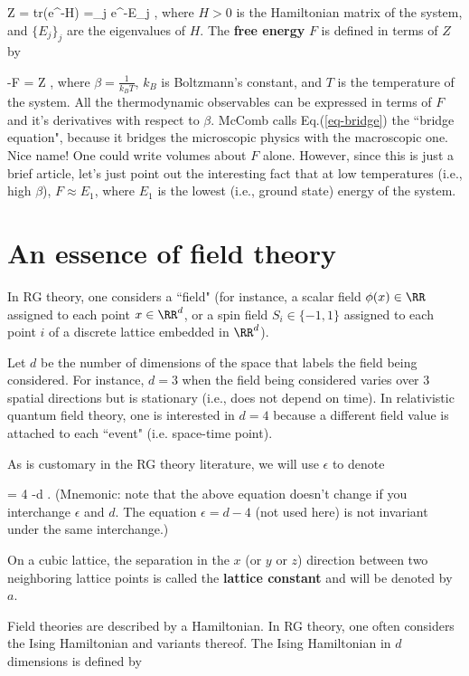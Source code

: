 \documentclass[12pt]{article}
\begin{document}
\beq
Z = {\rm tr}(e^{-\beta H})
=\sum_j e^{-\beta E_j}
\;,
\eeq
where $H>0$ is the Hamiltonian matrix
of the system, and $\{E_j\}_j$ are the
eigenvalues of $H$.
The \textbf{free energy}
$F$ is defined in terms
of $Z$ by

\beq
-\beta F = \ln Z
\;,
\label{eq-bridge}
\eeq
 where
$\beta = \frac{1}{k_B T}$,
$k_B$ is Boltzmann's constant, and
$T$ is the temperature of the system.
All the thermodynamic observables
can be expressed in terms of
$F$ and it's derivatives with
respect to $\beta$.
McComb calls Eq.(\ref{eq-bridge})
the ``bridge equation",
because it bridges the microscopic physics
with the macroscopic one. Nice name!
One could write volumes about $F$
alone. However, since
this is just a brief article,
let's just point out the interesting fact that
at low temperatures (i.e., high $\beta$),
$F \approx E_1$, where $E_1$ is the
lowest (i.e., ground state)
energy of the system.


\section{An essence of field theory}
In RG theory, one considers
a ``field" (for instance,
a scalar field $\phi(x)\in \RR$
assigned to each point $x\in \RR^d$,
or a spin field $S_i\in\{-1,1\}$
assigned to each point $i$ of a
discrete lattice
embedded in $\RR^d$).


Let $d$ be the number of dimensions of
the space that labels
the field being considered. For
instance, $d=3$
when the field being considered varies over
3 spatial directions but
is stationary (i.e., does not depend on time).
In relativistic quantum field theory,
one is interested in
$d=4$ because a different field
value is attached to each ``event"
(i.e. space-time point).

As is customary in the RG theory literature,
we will use $\epsilon$ to denote

\beq
\epsilon = 4 -d
\;.
\eeq
(Mnemonic: note that the above
equation doesn't change if
you interchange $\epsilon$ and $d$.
The equation $\epsilon = d-4$ (not used here) is
not invariant under the same interchange.)


On a cubic lattice, the separation
in
the $x$ (or $y$ or $z$) direction
between two neighboring lattice points
is called the \textbf{lattice constant}
and will be denoted by $a$.

Field theories are described by
a Hamiltonian. In RG theory, one often
considers the
 Ising Hamiltonian
 and variants thereof.
 The Ising Hamiltonian in $d$ dimensions
 is defined by
\end{document}
